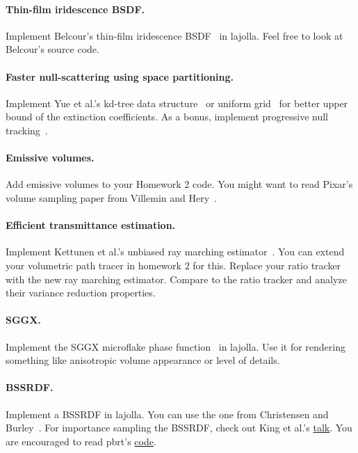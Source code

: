 \paragraph{Thin-film iridescence BSDF.}
Implement Belcour's thin-film iridescence BSDF~\cite{Belcour:2017:PEM} in lajolla.
Feel free to look at Belcour's source code.

\paragraph{Faster null-scattering using space partitioning.}
Implement Yue et al.'s kd-tree data structure~\cite{Yue:2010:UAS} or uniform grid~\cite{Yue:2011:TOS} for better upper bound of the extinction coefficients. As a bonus, implement progressive null tracking~\cite{Misso:2023:PNT}. 

\paragraph{Emissive volumes.}
Add emissive volumes to your Homework 2 code. You might want to read Pixar's volume sampling paper from Villemin and Hery~\cite{Villemin:2013:PIF}.

\paragraph{Efficient transmittance estimation.}
Implement Kettunen et al.'s unbiased ray marching estimator~\cite{Kettunen:2021:URT}.
You can extend your volumetric path tracer in homework 2 for this.
Replace your ratio tracker with the new ray marching estimator.
Compare to the ratio tracker and analyze their variance reduction properties.

\paragraph{SGGX.}
Implement the SGGX microflake phase function~\cite{Heitz:2015:SMD} in lajolla. Use it for rendering something like anisotropic volume appearance or level of details.

\paragraph{BSSRDF.}
Implement a BSSRDF in lajolla.
You can use the one from Christensen and Burley~\cite{Christensen:2015:ARP}.
For importance sampling the BSSRDF, check out King et al.'s \href{https://pdfs.semanticscholar.org/90da/5211ce2a6f63d50b8616736c393aaf8bf4ca.pdf}{talk}.
You are encouraged to read pbrt's \href{https://www.pbr-book.org/3ed-2018/Light_Transport_II_Volume_Rendering/Sampling_Subsurface_Reflection_Functions}{code}.

